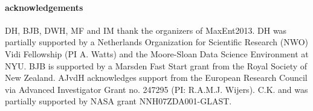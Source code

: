 \documentclass[12pt]{emulateapj}
\begin{document}
\paragraph{acknowledgements}
DH, BJB, DWH, MF and IM thank the organizers of MaxEnt2013. DH was partially supported by a Netherlands Organization for Scientific Research (NWO) Vidi Fellowship (PI A. Watts) and the Moore-Sloan Data Science Environment at NYU. BJB is supported
by a Marsden Fast Start grant from the Royal Society of New Zealand. AJvdH acknowledges support from the European Research Council via Advanced Investigator Grant no. 247295 (PI: R.A.M.J. Wijers).
C.K. and was partially supported by NASA grant NNH07ZDA001-GLAST.  



\end{document}

